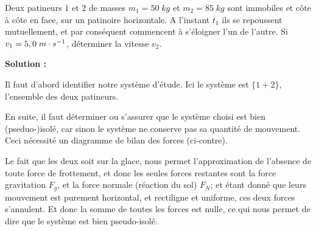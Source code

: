 \documentclass[11pt,a4paper]{article}
\begin{document}
\begin{eg}
Deux patineurs $1$ et $2$ de masses $m_1 = 50\; kg$ et $m_2 = 85\; kg $ sont immobiles et côte à côte en face, sur un patinoire horizontale. A l'instant $t_1$ ils se repoussent mutuellement, et par conséquent commencent à s'éloigner l'un de l'autre. Si $v_1 = 5,0\; m\cdot s^{-1}$, déterminer la vitesse $v_2$. 

\textbf{Solution : }


\begin{figure}
\centering
{} %

\end{figure}

Il faut d'abord identifier notre système d'étude. Ici le système est $\{ 1 + 2 \} $, l'ensemble des deux patineurs. 

En suite, il faut déterminer ou s'assurer que le système choisi est bien (pseduo-)isolé, car sinon le système ne conserve pas sa quantité de mouvement. Ceci nécessité un diagramme de bilan des forces (ci-contre).

Le fait que les deux soit sur la glace, nous permet l'approximation de l'absence de toute force de frottement, et donc les seules forces restantes sont la force gravitation $F_g$, et la force normale (réaction du sol) $F_N$; et étant donné que leurs mouvement est purement horizontal, et rectiligne et uniforme, ces deux forces s'annulent. Et donc la somme de toutes les forces est nulle, ce qui nous permet de dire que le système est bien pseudo-isolé. 


\end{eg}
\end{document}
